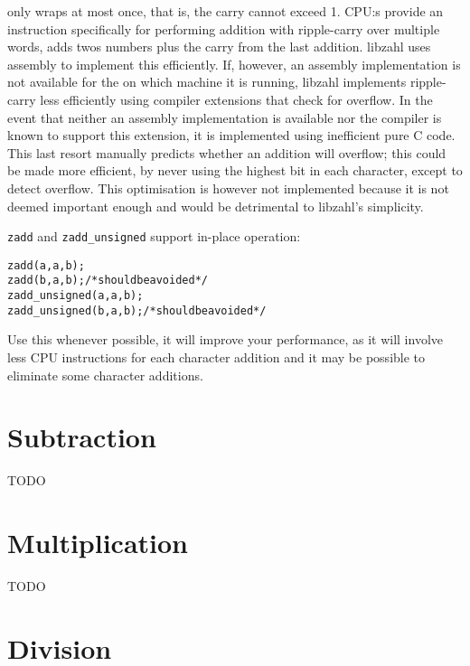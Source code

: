 \noindent
only wraps at most once, that is, the
carry cannot exceed 1. CPU:s provide an
instruction specifically for performing
addition with ripple-carry over multiple words,
adds twos numbers plus the carry from the
last addition. libzahl uses assembly to
implement this efficiently. If, however, an
assembly implementation is not available for
the on which machine it is running, libzahl
implements ripple-carry less efficiently
using compiler extensions that check for
overflow. In the event that neither an
assembly implementation is available nor
the compiler is known to support this
extension, it is implemented using inefficient
pure C code. This last resort manually
predicts whether an addition will overflow;
this could be made more efficient, by never
using the highest bit in each character,
except to detect overflow. This optimisation
is however not implemented because it is
not deemed important enough and would
be detrimental to libzahl's simplicity.

{\tt zadd} and {\tt zadd\_unsigned} support
in-place operation:

\begin{alltt}
   zadd(a, a, b);
   zadd(b, a, b);           \textcolor{c}{/* \textrm{should be avoided} */}
   zadd_unsigned(a, a, b);
   zadd_unsigned(b, a, b);  \textcolor{c}{/* \textrm{should be avoided} */}
\end{alltt}

\noindent
Use this whenever possible, it will improve
your performance, as it will involve less
CPU instructions for each character addition
and it may be possible to eliminate some
character additions.


\newpage
\section{Subtraction}
\label{sec:Subtraction}

TODO %


\newpage
\section{Multiplication}
\label{sec:Multiplication}

TODO %


\newpage
\section{Division}
\label{sec:Division}

